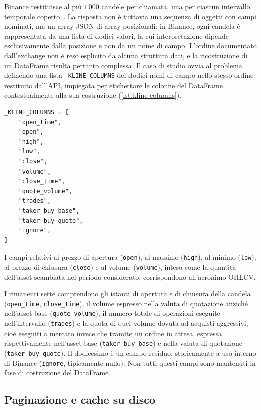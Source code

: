 Binance restituisce al più $1\,000$ candele per chiamata, una per ciascun intervallo temporale coperto~\cite{binance_api_docs}. La risposta non è tuttavia una sequenza di oggetti con campi nominati, ma un array JSON di array posizionali: in Binance, ogni candela è rappresentata da una lista di dodici valori, la cui interpretazione dipende esclusivamente dalla posizione e non da un nome di campo. L'ordine documentato dall'exchange non è reso esplicito da alcuna struttura dati, e la ricostruzione di un DataFrame risulta pertanto complessa. Il caso di studio ovvia al problema definendo una lista \texttt{\_KLINE\_COLUMNS} dei dodici nomi di campo nello stesso ordine restituito dall'API, impiegata per etichettare le colonne del DataFrame contestualmente alla sua costruzione (\cref{lst:kline-columns}).

\begin{listing}[H]
\begin{verbatim}
_KLINE_COLUMNS = [
    "open_time",
    "open",
    "high",
    "low",
    "close",
    "volume",
    "close_time",
    "quote_volume",
    "trades",
    "taker_buy_base",
    "taker_buy_quote",
    "ignore",
]
\end{verbatim}
\caption{\texttt{\_KLINE\_COLUMNS}}
\label{lst:kline-columns}
\end{listing}

I campi relativi al prezzo di apertura (\texttt{open}), al massimo (\texttt{high}), al minimo (\texttt{low}), al prezzo di chiusura (\texttt{close}) e al volume (\texttt{volume}), inteso come la quantità dell'asset scambiata nel periodo considerato, corrispondono all'acronimo OHLCV.

I rimanenti sette comprendono gli istanti di apertura e di chiusura della candela (\texttt{open\_time}, \texttt{close\_time}), il volume espresso nella valuta di quotazione anziché nell'asset base (\texttt{quote\_volume}), il numero totale di operazioni eseguite nell'intervallo (\texttt{trades}) e la quota di quel volume dovuta ad acquisti aggressivi, cioè eseguiti a mercato invece che tramite un ordine in attesa, espressa rispettivamente nell'asset base (\texttt{taker\_buy\_base}) e nella valuta di quotazione (\texttt{taker\_buy\_quote}). Il dodicesimo è un campo residuo, storicamente a uso interno di Binance (\texttt{ignore}, tipicamente nullo). Non tutti questi campi sono mantenuti in fase di costruzione del DataFrame.

\subsection{Paginazione e cache su disco}
\label{sec:pagination-disk-cache}

